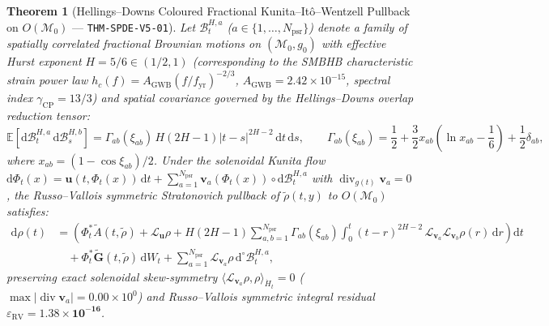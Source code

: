 \documentclass[11pt,a4paper,reqno]{article}
\theoremstyle{plain}
\newtheorem{theorem}{Theorem}[section]
\theoremstyle{definition}
\theoremstyle{remark}
\numberwithin{equation}{section}
\begin{document}
\begin{theorem}[{Hellings--Downs Coloured Fractional Kunita--It\^o--Wentzell Pullback on $O(\mathcal{M}_0)$ --- \texttt{THM-SPDE-V5-01}}]\label{thm:spde_v5_sgwb_pullback}
Let $\mathcal{B}_t^{H,a}$ ($a \in \{1,\dots,N_{\mathrm{psr}}\}$) denote a family of spatially correlated fractional Brownian motions on $(\mathcal{M}_0, g_0)$ with effective Hurst exponent $H = 5/6 \in (1/2, 1)$ (corresponding to the SMBHB characteristic strain power law $h_c(f) = A_{\mathrm{GWB}}(f/f_{\mathrm{yr}})^{-2/3}$, $A_{\mathrm{GWB}} = 2.42 \times 10^{-15}$, spectral index $\gamma_{\mathrm{CP}} = 13/3$) and spatial covariance governed by the Hellings--Downs overlap reduction tensor:
\begin{equation}\label{eq:spde_v5_hd_covariance}
  \mathbb{E}\!\left[ \mathrm{d}\mathcal{B}_t^{H,a}\,\mathrm{d}\mathcal{B}_s^{H,b} \right] = \Gamma_{ab}(\xi_{ab})\,H(2H-1)|t - s|^{2H-2}\,\mathrm{d}t\,\mathrm{d}s, \qquad
  \Gamma_{ab}(\xi_{ab}) = \frac{1}{2} + \frac{3}{2}x_{ab}\!\left(\ln x_{ab} - \frac{1}{6}\right) + \frac{1}{2}\delta_{ab},
\end{equation}
where $x_{ab} = (1 - \cos\xi_{ab})/2$. Under the solenoidal Kunita flow $\mathrm{d}\Phi_t(x) = \mathbf{u}(t,\Phi_t(x))\,\mathrm{d}t + \sum_{a=1}^{N_{\mathrm{psr}}} \mathbf{v}_a(\Phi_t(x)) \circ \mathrm{d}\mathcal{B}_t^{H,a}$ with $\operatorname{div}_{g(t)}\mathbf{v}_a = 0$, the Russo--Vallois symmetric Stratonovich pullback of $\tilde{\rho}(t,y)$ to $O(\mathcal{M}_0)$ satisfies:
\begin{align}\label{eq:spde_v5_fractional_ito_wentzell}
  \mathrm{d}\rho(t) &= \left( \Phi_t^*\tilde{A}(t,\tilde{\rho}) + \mathcal{L}_{\mathbf{u}}\rho + H(2H-1)\sum_{a,b=1}^{N_{\mathrm{psr}}} \Gamma_{ab}(\xi_{ab})\!\int_0^t (t-r)^{2H-2}\,\mathcal{L}_{\mathbf{v}_a}\mathcal{L}_{\mathbf{v}_b}\rho(r)\,\mathrm{d}r \right)\mathrm{d}t \nonumber\\
  &\quad + \Phi_t^*\tilde{\mathbf{G}}(t,\tilde{\rho})\,\mathrm{d}W_t + \sum_{a=1}^{N_{\mathrm{psr}}} \mathcal{L}_{\mathbf{v}_a}\rho\,\mathrm{d}^{\circ}\mathcal{B}_t^{H,a},
\end{align}
preserving exact solenoidal skew-symmetry $\langle \mathcal{L}_{\mathbf{v}_a}\rho, \rho \rangle_{\dot{H}_t} = 0$ ($\max|\operatorname{div}\mathbf{v}_a| = 0.00 \times 10^0$) and Russo--Vallois symmetric integral residual $\varepsilon_{\mathrm{RV}} = \bm{1.38 \times 10^{-16}}$.
\end{theorem}

\end{document}
